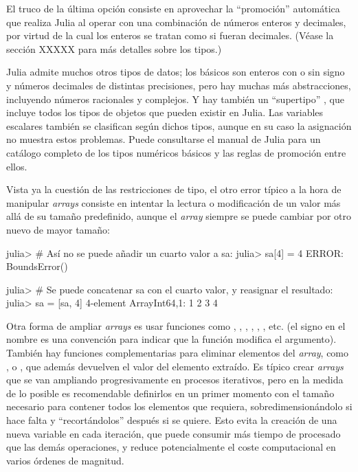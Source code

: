 El truco de la última opción consiste en aprovechar la ``promoción'' automática que realiza Julia al operar con una combinación de números enteros y decimales, por virtud de la cual los enteros se tratan como si fueran decimales. (Véase la sección XXXXX para más detalles sobre los tipos.)

Julia admite muchos otros tipos de datos; los básicos son enteros con o sin signo y números decimales de distintas precisiones, pero hay muchas más abstracciones, incluyendo números racionales y complejos. Y hay también un ``supertipo'' , que incluye todos los tipos de objetos que pueden existir en Julia. Las variables escalares también se clasifican según dichos tipos, aunque en su caso la asignación no muestra estos problemas. Puede consultarse el manual de Julia para un catálogo completo de los tipos numéricos básicos y las reglas de promoción entre ellos.

Vista ya la cuestión de las restricciones de tipo, el otro error típico a la hora de manipular \emph{arrays} consiste en intentar la lectura o modificación de un valor más allá de su tamaño predefinido, aunque el \emph{array} siempre se puede cambiar por otro nuevo de mayor tamaño:

\begin{jlconcode}
julia> # Así no se puede añadir un cuarto valor a sa:
julia> sa[4] = 4
ERROR: BoundsError()

julia> # Se puede concatenar sa con el cuarto valor, y reasignar el resultado:
julia> sa = [sa, 4]
4-element Array{Int64,1}:
 1 
 2 
 3 
 4
\end{jlconcode}

Otra forma de ampliar \emph{arrays} es usar funciones como , , , , , , etc. (el signo \code{!} en el nombre es una convención para indicar que la función modifica el argumento). También hay funciones complementarias para eliminar elementos del \emph{array}, como ,  o , que además devuelven el valor del elemento extraído. Es típico crear \emph{arrays} que se van ampliando progresivamente en procesos iterativos, pero en la medida de lo posible es recomendable definirlos en un primer momento con el tamaño necesario para contener todos los elementos que requiera, sobredimensionándolo si hace falta y ``recortándolos'' después si se quiere. Esto evita la creación de una nueva variable en cada iteración, que puede consumir más tiempo de procesado que las demás operaciones, y reduce potencialmente el coste computacional en varios órdenes de magnitud.

